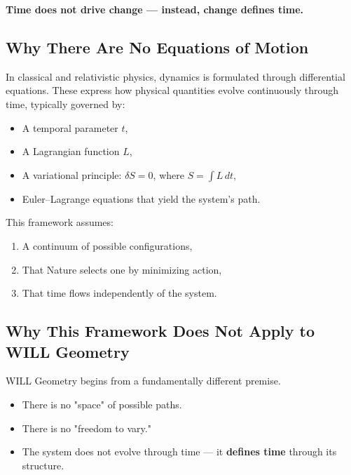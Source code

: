 \documentclass[12pt, a4paper]{article}
\begin{document}
\begin{tcolorbox}[colback=gray!5,colframe=black!40!black,title=This reveals a fundamental inversion of the classical paradigm:]
 \textbf{Time does not drive change — instead, change defines time.}
\end{tcolorbox}

\subsection*{Why There Are No Equations of Motion}

In classical and relativistic physics, dynamics is formulated through differential equations.  
These express how physical quantities evolve continuously through time, typically governed by:

\begin{itemize}
    \item A temporal parameter $t$,
    \item A Lagrangian function $L$,
    \item A variational principle: $\delta S = 0$, where $S = \int L\,dt$,
    \item Euler–Lagrange equations that yield the system’s path.
\end{itemize}

This framework assumes:

\begin{enumerate}
    \item A continuum of possible configurations,
    \item That Nature selects one by minimizing action,
    \item That time flows independently of the system.
\end{enumerate}

\subsection*{Why This Framework Does Not Apply to WILL Geometry}

WILL Geometry begins from a fundamentally different premise.

\begin{itemize}
    \item There is no "space" of possible paths.
    \item There is no "freedom to vary."
    \item The system does not evolve through time --- it \textbf{defines time} through its structure.
\end{itemize}
\end{document}
